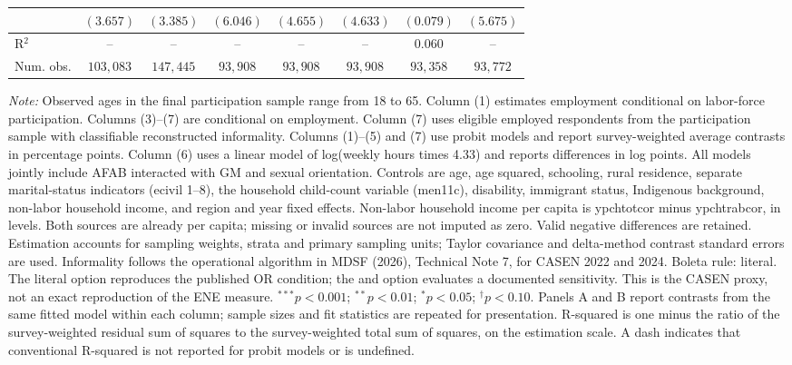 \begin{table}[htpb!]
{\begin{tabular}{l c c c c c c c}
 & $(3.657)$ & $(3.385)$ & $(6.046)$ & $(4.655)$ & $(4.633)$ & $(0.079)$ & $(5.675)$ \\
\hline
R$^2$ & -- & -- & -- & -- & -- & $0.060$ & -- \\
Num. obs. & $103,083$ & $147,445$ & $93,908$ & $93,908$ & $93,908$ & $93,358$ & $93,772$ \\
\hline
\end{tabular}%
}
\par\vspace{1ex}
\begin{minipage}{\textwidth}\footnotesize\raggedright
\textit{Note:} Observed ages in the final participation sample range from 18 to 65. Column (1) estimates employment conditional on labor-force participation. Columns (3)--(7) are conditional on employment.  Column (7) uses eligible employed respondents from the participation sample with classifiable reconstructed informality. Columns (1)--(5) and (7) use probit models and report survey-weighted average contrasts in percentage points. Column (6) uses a linear model of log(weekly hours times 4.33) and reports differences in log points. All models jointly include AFAB interacted with GM and sexual orientation. Controls are age, age squared, schooling, rural residence, separate marital-status indicators (ecivil 1--8), the household child-count variable (men11c), disability, immigrant status, Indigenous background, non-labor household income, and region and year fixed effects. Non-labor household income per capita is ypchtotcor minus ypchtrabcor, in levels. Both sources are already per capita; missing or invalid sources are not imputed as zero. Valid negative differences are retained. Estimation accounts for sampling weights, strata and primary sampling units; Taylor covariance and delta-method contrast standard errors are used. Informality follows the operational algorithm in MDSF (2026), Technical Note 7, for CASEN 2022 and 2024. Boleta rule: literal. The literal option reproduces the published OR condition; the and option evaluates a documented sensitivity. This is the CASEN proxy, not an exact reproduction of the ENE measure. $^{***}p<0.001$; $^{**}p<0.01$; $^{*}p<0.05$; $^{\dagger}p<0.10$. Panels A and B report contrasts from the same fitted model within each column; sample sizes and fit statistics are repeated for presentation. R-squared is one minus the ratio of the survey-weighted residual sum of squares to the survey-weighted total sum of squares, on the estimation scale. A dash indicates that conventional R-squared is not reported for probit models or is undefined.
\end{minipage}
\end{table}
